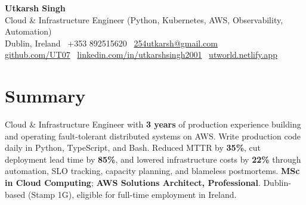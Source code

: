 \documentclass[10pt,a4paper]{article}
\begin{document}
\begin{center}
{\Large \textbf{Utkarsh Singh}}\\[0.04em]
{\normalsize Cloud \& Infrastructure Engineer (Python, Kubernetes, AWS, Observability, Automation)}\\[0.08em]
Dublin, Ireland \textbar\ +353 892515620 \textbar\ \href{mailto:254utkarsh@gmail.com}{254utkarsh@gmail.com}\\[0.08em]
\href{https://github.com/UT07}{github.com/UT07} \textbar\
\href{https://www.linkedin.com/in/utkarshsingh2001/}{linkedin.com/in/utkarshsingh2001} \textbar\
\href{https://utworld.netlify.app}{utworld.netlify.app}
\end{center}
\vspace{0.06em}

\section*{Summary}
Cloud \& Infrastructure Engineer with \textbf{3 years} of production experience building and operating fault-tolerant distributed systems on AWS. Write production code daily in Python, TypeScript, and Bash. Reduced MTTR by \textbf{35\%}, cut deployment lead time by \textbf{85\%}, and lowered infrastructure costs by \textbf{22\%} through automation, SLO tracking, capacity planning, and blameless postmortems. \textbf{MSc in Cloud Computing}; \textbf{AWS Solutions Architect, Professional}. Dublin-based (Stamp 1G), eligible for full-time employment in Ireland.

\end{document}
